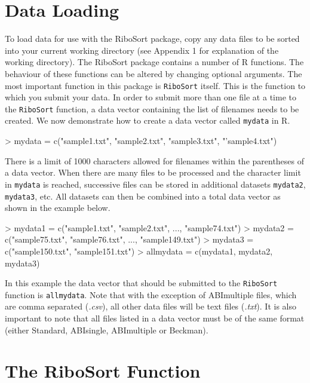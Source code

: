 \documentclass[a4paper]{article}
\begin{document}
\section{Data Loading}

To load data for use with the RiboSort package, copy any data files to be sorted into your current working directory (see Appendix 1 for explanation of the working directory). The RiboSort package contains a number of R functions. The behaviour of these functions can be altered by changing optional arguments. The most important function in this package is \texttt{RiboSort} itself. This is the function to which you submit your data. In order to submit more than one file at a time to the \texttt{RiboSort} function, a data vector containing the list of filenames needs to be created. We now demonstrate how to create a data vector called \texttt{mydata} in R.

\begin{Schunk}
\begin{Sinput}
> mydata = c("sample1.txt", "sample2.txt", "sample3.txt", "'sample4.txt")
\end{Sinput}
\end{Schunk}
There is a limit of 1000 characters allowed for filenames within the parentheses of a data vector. When there are many files to be processed and the character limit in \texttt{mydata} is reached, successive files can be stored in additional datasets \texttt{mydata2}, \texttt{mydata3}, etc. All datasets can then be combined into a total data vector as shown in the example below. 

\begin{Schunk}
\begin{Sinput}
> mydata1 = c("sample1.txt", "sample2.txt", ..., "sample74.txt")
> mydata2 = c("sample75.txt", "sample76.txt", ..., "sample149.txt")
> mydata3 = c("sample150.txt", "sample151.txt")
> allmydata = c(mydata1, mydata2, mydata3)
\end{Sinput}
\end{Schunk}
In this example the data vector that should be submitted to the \texttt{RiboSort} function is \texttt{allmydata}. Note that with the exception of ABImultiple files, which are comma separated (\textit{.csv}), all other data files will be text files (\textit{.txt}). It is also important to note that all files listed in a data vector must be of the same format (either Standard, ABIsingle, ABImultiple or Beckman).

\section{The RiboSort Function}
\end{document}
